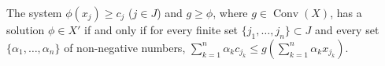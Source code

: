 The system $\phi(x_j) \geqslant c_j$ ($j \in J$) and $g \geqslant \phi$, where $g \in \operatorname{Conv}(X)$, has a solution $\phi \in X'$ if and only if for every finite set $\{j_1,\ldots,j_n\} \subset J$ and every set $\{\alpha_1,\ldots,\alpha_n\}$ of non-negative numbers, $\sum_{k=1}^n \alpha_k c_{j_k} \leqslant g(\sum_{k=1}^n \alpha_k x_{j_k})$.